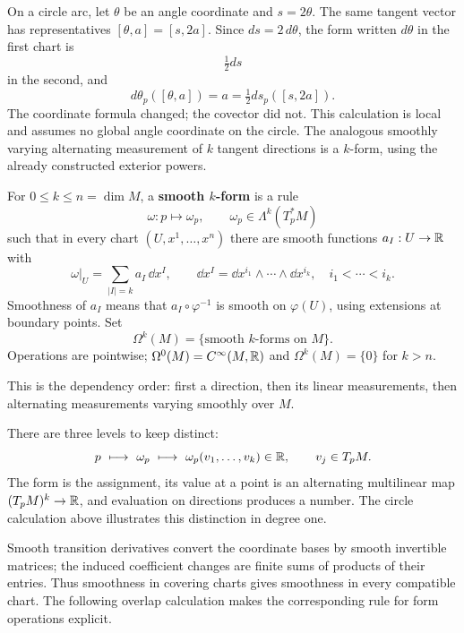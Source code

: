 On a circle arc, let $\theta$ be an angle coordinate and $s=2\theta$.
The same tangent vector has representatives $[\theta,a]=[s,2a]$.
Since $ds=2\,d\theta$, the form written $d\theta$ in the first chart
is
\[
\tfrac12 ds
\]
 in the second, and
\[
d\theta_p([\theta,a])=a
=\tfrac12 ds_p([s,2a]).
\]
The coordinate formula changed; the covector did not. This calculation
is local and assumes no global angle coordinate on the circle.
The analogous smoothly varying alternating measurement of $k$ tangent
directions is a $k$-form, using the already constructed exterior powers.

\begin{definition}\label{def:manifold-forms}
For $0\leq k\leq n=\dim M$, a \textbf{smooth $k$-form} is a rule
\[
\boxed{\omega:p\longmapsto\omega_p,\qquad\omega_p\in\Lambda^k(T_p^*M)}
\]
such that in every chart $(U,x^1,\ldots,x^n)$ there are smooth
functions $a_I:U\to\mathbb{R}$ with
\[
\boxed{\omega|_U=\sum_{|I|=k}a_I\,\dd x^I,\qquad
\dd x^I=\dd x^{i_1}\wedge\cdots\wedge\dd x^{i_k},\quad i_1<\cdots<i_k.}
\]
Smoothness of $a_I$ means that $a_I\circ\varphi^{-1}$ is smooth on
$\varphi(U)$, using extensions at boundary points. Set
\[
\Omega^k(M)=\{\text{smooth }k\text{-forms on }M\}.
\]
Operations are pointwise; $\Omega^0(M)=C^\infty(M,\mathbb{R})$ and
$\Omega^k(M)=\{0\}$ for $k>n$.
\end{definition}
\begin{center}
\end{center}
This is the dependency order: first a direction, then its linear
measurements, then alternating measurements varying smoothly over $M$.

There are three levels to keep distinct:
\[
p\ \longmapsto\ \omega_p\ \longmapsto\
\omega_p(v_1,\ldots,v_k)\in\mathbb{R},\qquad v_j\in T_pM.
\]
The form is the assignment, its value at a point is an alternating
multilinear map $(T_pM)^k\to\mathbb{R}$, and evaluation on directions produces
a number. The circle calculation above illustrates this distinction in degree one.

Smooth transition derivatives convert the coordinate bases by smooth
invertible matrices; the induced coefficient changes are finite sums
of products of their entries. Thus smoothness in covering charts gives
smoothness in every compatible chart. The following overlap calculation
makes the corresponding rule for form operations explicit.

